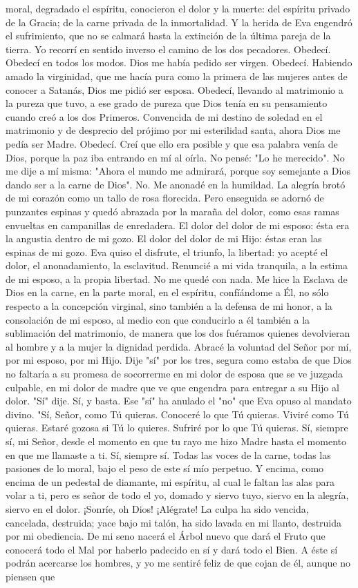 \documentclass[12pt]{book} %
\begin{document}
moral, degradado el espíritu, conocieron el dolor y la muerte: del espíritu privado de la Gracia; de la carne privada de la inmortalidad. Y la herida de Eva engendró el sufrimiento, que no se calmará hasta la extinción de la última pareja de la tierra. Yo recorrí en sentido inverso el camino de los dos pecadores. Obedecí. Obedecí en todos los modos. Dios me había pedido ser virgen. Obedecí. Habiendo amado la virginidad, que me hacía pura como la primera de las mujeres antes de conocer a Satanás, Dios me pidió ser esposa. Obedecí, llevando al matrimonio a la pureza que tuvo, a ese grado de pureza que Dios tenía en su pensamiento cuando creó a los dos Primeros. Convencida de mi destino de soledad en el matrimonio y de desprecio del prójimo por mi esterilidad santa, ahora Dios me pedía ser Madre. Obedecí. Creí que ello era posible y que esa palabra venía de Dios, porque la paz iba entrando en mí al oírla. No pensé: "Lo he merecido". No me dije a mí misma: "Ahora el mundo me admirará, porque soy semejante a Dios dando ser a la carne de Dios". No. Me anonadé en la humildad. La alegría brotó de mi corazón como un tallo de rosa florecida. Pero enseguida se adornó de punzantes espinas y quedó abrazada por la maraña del dolor, como esas ramas envueltas en campanillas de enredadera. El dolor del dolor de mi esposo: ésta era la angustia dentro de mi gozo. El dolor del dolor de mi Hijo: éstas eran las espinas de mi gozo. Eva quiso el disfrute, el triunfo, la libertad: yo acepté el dolor, el anonadamiento, la esclavitud. Renuncié a mi vida tranquila, a la estima de mi esposo, a la propia libertad. No me quedé con nada. Me hice la Esclava de Dios en la carne, en la parte moral, en el espíritu, confíándome a Él, no sólo respecto a la concepción virginal, sino también a la defensa de mi honor, a la consolación de mi esposo, al medio con que conducirlo a él también a la sublimación del matrimonio, de manera que los dos fuéramos quienes devolvieran al hombre y a la mujer la dignidad perdida. Abracé la voluntad del Señor por mí, por mi esposo, por mi Hijo. Dije "sí" por los tres, segura como estaba de que Dios no faltaría a su promesa de socorrerme en mi dolor de esposa que se ve juzgada culpable, en mi dolor de madre que ve que engendra para entregar a su Hijo al dolor. "Sí" dije. Sí, y basta. Ese "sí" ha anulado el "no" que Eva opuso al mandato divino. "Sí, Señor, como Tú quieras. Conoceré lo que Tú quieras. Viviré como Tú quieras. Estaré gozosa si Tú lo quieres. Sufriré por lo que Tú quieras. Sí, siempre sí, mi Señor, desde el momento en que tu rayo me hizo Madre hasta el momento en que me llamaste a ti. Sí, siempre sí. Todas las voces de la carne, todas las pasiones de lo moral, bajo el peso de este sí mío perpetuo. Y encima, como encima de un pedestal de diamante, mi espíritu, al cual le faltan las alas para volar a ti, pero es señor de todo el yo, domado y siervo tuyo, siervo en la alegría, siervo en el dolor. ¡Sonríe, oh Dios! ¡Alégrate! La culpa ha sido vencida, cancelada, destruida; yace bajo mi talón, ha sido lavada en mi llanto, destruida por mi obediencia. De mi seno nacerá el Árbol nuevo que dará el Fruto que conocerá todo el Mal por haberlo padecido en sí y dará todo el Bien. A éste sí podrán acercarse los hombres, y yo me sentiré feliz de que cojan de él, aunque no piensen que 
\end{document}
